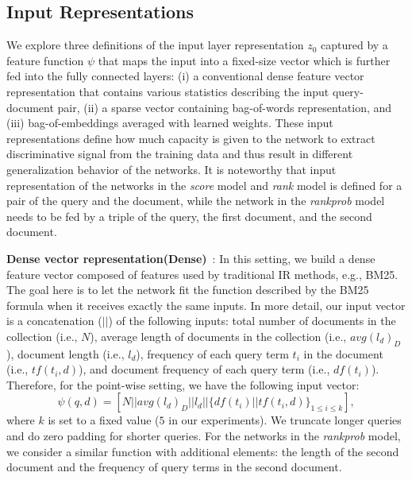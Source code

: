 \documentclass[sigconf]{acmart}
\newcommand{\modelone}{\textit{score} model\xspace}
\newcommand{\modeltwo}{\textit{rank} model\xspace}
\newcommand{\modelthree}{\textit{rank\-prob} model\xspace}
\newcommand{\Feedone}{Dense vector representation\xspace}
\newcommand{\fone}{Dense\xspace}
\newcommand{\mypar}[1]{\vspace*{-0.1ex}\medskip\noindent\textbf{#1}~}
\begin{document}
\subsection{Input Representations}
\label{sec:feedings}
We explore three definitions of the input layer representation $z_0$ captured by a feature function $\psi$ that maps the input into a fixed-size vector which is further fed into the fully connected layers: 
(i) a conventional dense feature vector representation that contains various statistics describing the input query-document pair, 
(ii) a sparse vector containing bag-of-words representation, and 
(iii) bag-of-embeddings averaged with learned weights. 
These input representations define how much capacity is given to the network to extract discriminative signal from the training data and thus result in different generalization behavior of the networks. 
It is noteworthy that input representation of the networks in the \modelone and \modeltwo is defined for a pair of the query and the document, while the network in the \modelthree needs to be fed by a triple of the query, the first document, and the second document.

\mypar{\Feedone (\fone)}: 
In this setting, we build a dense feature vector composed of features used by traditional IR methods, e.g., BM25. The goal here is to let the network fit the function described by the BM25 formula when it receives exactly the same inputs. 
In more detail, our input vector is a concatenation ($||$) of the following inputs: total number of documents in the collection (i.e., $N$), average length of documents in the collection (i.e., $avg(l_d)_D$), document length (i.e., $l_d$), frequency of each query term $t_i$ in the document (i.e., $tf(t_i, d)$), and document frequency of each query term (i.e., $df(t_i)$). Therefore, for the point-wise setting, we have the following input vector:
\begin{equation}
\psi(q, d) = [N || avg(l_d)_D || l_d || \{df(t_i) || tf(t_i,d)\}_{1 \leq i \leq k}],
\end{equation}
where $k$ is set to a fixed value ($5$ in our experiments). 
We truncate longer queries and do zero padding for shorter queries. 
For the networks in the \modelthree, we consider a similar function with additional elements: the length of the second document and the frequency of query terms in the second document.
\end{document}
